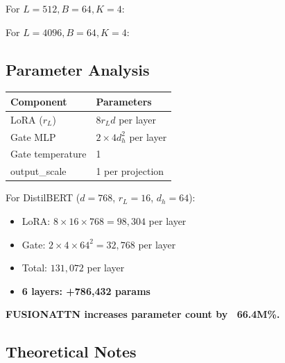 For $L = 512, B = 64, K = 4$:

For $L = 4096, B = 64, K = 4$:

\subsection{Parameter Analysis}

\begin{table}[H]
\centering
\small
\begin{tabular}{ll}
\toprule
\textbf{Component} & \textbf{Parameters} \\
\midrule
LoRA ($r_L$) & $8 r_L d$ per layer \\
Gate MLP & $2 \times 4 d_h^2$ per layer \\
Gate temperature & 1 \\
output\_scale & 1 per projection \\
\bottomrule
\end{tabular}
\end{table}

For DistilBERT ($d=768$, $r_L=16$, $d_h=64$):

\begin{itemize}
\item LoRA: $8 \times 16 \times 768 = 98{,}304$ per layer
\item Gate: $2 \times 4 \times 64^2 = 32{,}768$ per layer
\item Total: $131{,}072$ per layer
\item \textbf{6 layers: +786,432 params}

\end{itemize}
\textbf{FUSIONATTN increases parameter count by ~66.4M\%.}

\subsection{Theoretical Notes}

